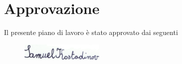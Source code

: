 \section*{Approvazione}
Il presente piano di lavoro è stato approvato dai seguenti

\noindent

\vspace*{2cm}


    


\vspace{.3in}
\begin{figure}[!h]
	\advance\leftskip 1.5cm
	\hspace{-0.5in}
	\includegraphics[width=4cm, keepaspectratio=true]{img/Firma.png}
\end{figure}
\vspace{.8in}
